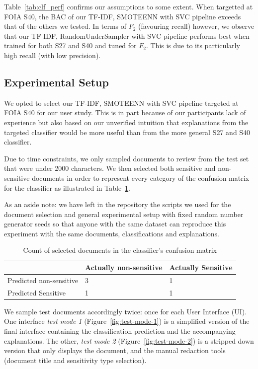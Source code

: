 \documentclass[\version]{l4proj}
\begin{document}
Table~\ref{tab:clf_perf} confirms our assumptions to some extent.
When targetted at FOIA S40, the BAC of our TF-IDF, SMOTEENN with SVC pipeline exceeds that of the others we tested.
In terms of \(F_{2}\) (favouring recall) however, we observe that our TF-IDF, RandomUnderSampler with SVC pipeline performs best when trained for both S27 and S40 and tuned for \(F_{2}\).
This is due to its particularly high recall (with low precision).

\subsection{Experimental Setup}

We opted to select our TF-IDF, SMOTEENN with SVC pipeline targeted at FOIA S40 for our user study.
This is in part because of our participants lack of experience but also based on our unverified intuition that explanations from the targeted classifier would be more useful than from the more general S27 and S40 classifier.

Due to time constraints, we only sampled documents to review from the test set that were under 2000 characters.
We then selected both sensitive and non-sensitive documents in order to represent every category of the confusion matrix for the classifier as illustrated in Table~\ref{tab:confusion-matrix-selection}.

As an aside note: we have left in the repository the scripts we used for the document selection and general experimental setup with fixed random number generator seeds so that anyone with the same dataset can reproduce this experiment with the same documents, classifications and explanations.

\begin{table}[H]
    \centering
    \small
    \begin{tabular}{l|ll}
                                & Actually non-sensitive & Actually Sensitive \\ \hline
        Predicted non-sensitive & 3                      & 1                  \\
        Predicted Sensitive     & 1                      & 1
    \end{tabular}
    \caption{Count of selected documents in the classifier's confusion matrix}\label{tab:confusion-matrix-selection}
    \vspace{-15pt}
\end{table}

We sample test documents accordingly twice: once for each User Interface (UI).
One interface \textit{test mode 1} (Figure~\ref{fig:test-mode-1}) is a simplified version of the final interface containing the classification prediction and the accompanying explanations.
The other, \textit{test mode 2} (Figure~\ref{fig:test-mode-2}) is a stripped down version that only displays the document, and the manual redaction tools (document title and sensitivity type selection).
\end{document}
